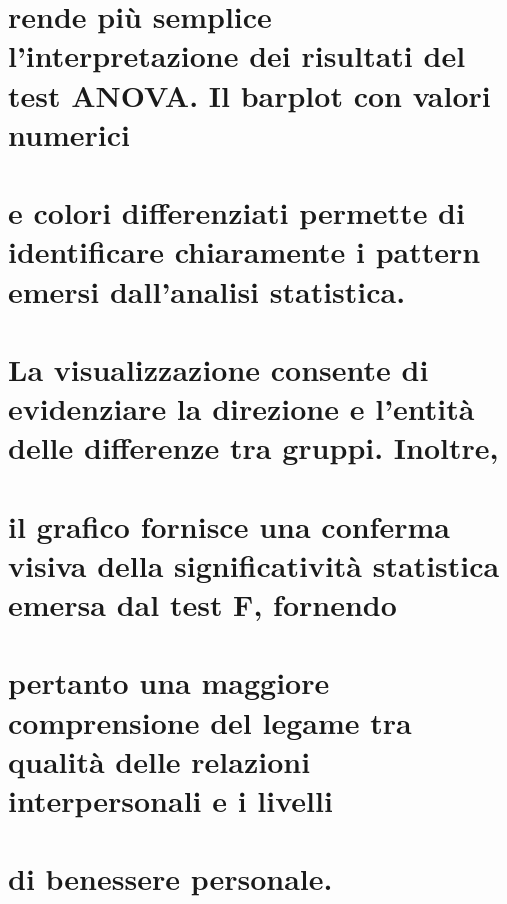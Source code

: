 \documentclass[
]{article}
\begin{document}
\section{rende più semplice l'interpretazione dei risultati del test
ANOVA. Il barplot con valori
numerici}\label{rende-piuxf9-semplice-linterpretazione-dei-risultati-del-test-anova.-il-barplot-con-valori-numerici}

\section{e colori differenziati permette di identificare chiaramente i
pattern emersi dall'analisi
statistica.}\label{e-colori-differenziati-permette-di-identificare-chiaramente-i-pattern-emersi-dallanalisi-statistica.}

\section{La visualizzazione consente di evidenziare la direzione e
l'entità delle differenze tra gruppi.
Inoltre,}\label{la-visualizzazione-consente-di-evidenziare-la-direzione-e-lentituxe0-delle-differenze-tra-gruppi.-inoltre}

\section{il grafico fornisce una conferma visiva della significatività
statistica emersa dal test F,
fornendo}\label{il-grafico-fornisce-una-conferma-visiva-della-significativituxe0-statistica-emersa-dal-test-f-fornendo}

\section{pertanto una maggiore comprensione del legame tra qualità delle
relazioni interpersonali e i
livelli}\label{pertanto-una-maggiore-comprensione-del-legame-tra-qualituxe0-delle-relazioni-interpersonali-e-i-livelli}

\section{di benessere personale.}\label{di-benessere-personale.}
\end{document}
